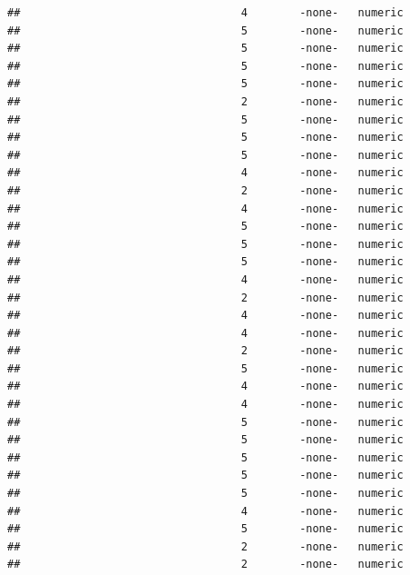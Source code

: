 \documentclass[
  12pt,
]{article}
\begin{document}
\begin{verbatim}
##                                  4        -none-   numeric                    
##                                  5        -none-   numeric                    
##                                  5        -none-   numeric                    
##                                  5        -none-   numeric                    
##                                  5        -none-   numeric                    
##                                  2        -none-   numeric                    
##                                  5        -none-   numeric                    
##                                  5        -none-   numeric                    
##                                  5        -none-   numeric                    
##                                  4        -none-   numeric                    
##                                  2        -none-   numeric                    
##                                  4        -none-   numeric                    
##                                  5        -none-   numeric                    
##                                  5        -none-   numeric                    
##                                  5        -none-   numeric                    
##                                  4        -none-   numeric                    
##                                  2        -none-   numeric                    
##                                  4        -none-   numeric                    
##                                  4        -none-   numeric                    
##                                  2        -none-   numeric                    
##                                  5        -none-   numeric                    
##                                  4        -none-   numeric                    
##                                  4        -none-   numeric                    
##                                  5        -none-   numeric                    
##                                  5        -none-   numeric                    
##                                  5        -none-   numeric                    
##                                  5        -none-   numeric                    
##                                  5        -none-   numeric                    
##                                  4        -none-   numeric                    
##                                  5        -none-   numeric                    
##                                  2        -none-   numeric                    
##                                  2        -none-   numeric                    

\end{verbatim}
\end{document}
